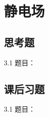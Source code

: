 \chapter{静电场}

\section{思考题}

\begin{thinking}{3.1}
  题目：\todoanswer

  \begin{solution}
    \todoanswer
  \end{solution}
\end{thinking}

\section{课后习题}

\begin{exercise}{3.1}
  题目：\todoanswer

  \begin{solution}
    \todoanswer
  \end{solution}
\end{exercise}
